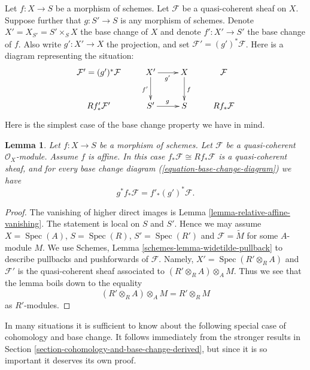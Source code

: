 \documentclass{stacks-project}
\theoremstyle{plain}
\newtheorem{lemma}[subsection]{Lemma}
\theoremstyle{definition}
\theoremstyle{remark}
\numberwithin{equation}{subsection}
\def\Spec{\mathop{\mathrm{Spec}}}
\begin{document}
\noindent
Let $f : X \to S$ be a morphism of schemes.
Let $\mathcal{F}$ be a quasi-coherent sheaf on $X$.
Suppose further that $g : S' \to S$ is any morphism of schemes. Denote
$X' = X_{S'} = S' \times_S X$ the base change of $X$ and denote
$f' : X' \to S'$ the base change of $f$.
Also write $g' : X' \to X$ the projection,
and set $\mathcal{F}' = (g')^*\mathcal{F}$.
Here is a diagram representing the situation:
\begin{equation}
\label{equation-base-change-diagram}
\vcenter{
\xymatrix{
\mathcal{F}' = (g')^*\mathcal{F} &
X' \ar[r]_{g'} \ar[d]_{f'} &
X \ar[d]^f &
\mathcal{F} \\
Rf'_*\mathcal{F}' &
S' \ar[r]^g &
S &
Rf_*\mathcal{F}
}
}
\end{equation}
Here is the simplest case of the base change property we have in mind.

\begin{lemma}
\label{lemma-affine-base-change}
Let $f : X \to S$ be a morphism of schemes.
Let $\mathcal{F}$ be a quasi-coherent $\mathcal{O}_X$-module.
Assume $f$ is affine.
In this case $f_*\mathcal{F} \cong Rf_*\mathcal{F}$ is
a quasi-coherent sheaf, and for every base change diagram
(\ref{equation-base-change-diagram})
we have
$$
g^*f_*\mathcal{F} = f'_*(g')^*\mathcal{F}.
$$
\end{lemma}

\begin{proof}
The vanishing of higher direct images is
Lemma \ref{lemma-relative-affine-vanishing}.
The statement is local on $S$ and $S'$. Hence we may
assume $X = \Spec(A)$, $S = \Spec(R)$,
$S' = \Spec(R')$ and $\mathcal{F} = \widetilde{M}$
for some $A$-module $M$.
We use Schemes, Lemma \ref{schemes-lemma-widetilde-pullback}
to describe pullbacks and pushforwards of $\mathcal{F}$.
Namely, $X' = \Spec(R' \otimes_R A)$ and
$\mathcal{F}'$ is the quasi-coherent sheaf associated
to $(R' \otimes_R A) \otimes_A M$.
Thus we see that the lemma boils down to the
equality
$$
(R' \otimes_R A) \otimes_A M = R' \otimes_R M
$$
as $R'$-modules.
\end{proof}

\noindent
In many situations it is sufficient to know about the following
special case of cohomology and base change. It follows immediately
from the stronger results in
Section \ref{section-cohomology-and-base-change-derived},
but since it is so important it deserves its own proof.
\end{document}
